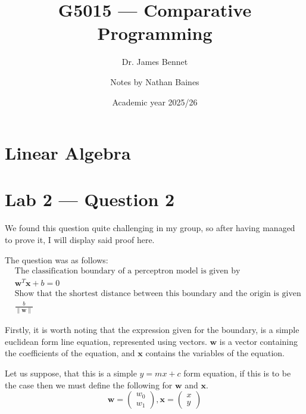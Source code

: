 \documentclass[a4paper]{article}
\title{G5015 --- Comparative Programming}
\author{Dr. James Bennet \and Notes by Nathan Baines}
\date{Academic year 2025/26}
\newcommand{\norm}[1]{\left\lVert#1\right\rVert}
\begin{document}
\maketitle

\tableofcontents

\section{Linear Algebra}




\appendix
\section{Lab 2 --- Question 2}
We found this question quite challenging in my group, so after having managed to prove it, I will display said proof here.

The question was as follows:
\begin{equation}\begin{split}
		&\textrm{The classification boundary of a perceptron model is given by}                    \\
		&\mathbf{w}^T\mathbf{x}+b=0                                                                \\
		&\textrm{Show that the shortest distance between this boundary and the origin is given by} \\
		&\frac{b}{\norm{\mathbf{w}}}
	\end{split}\end{equation}

Firstly, it is worth noting that the expression given for the boundary, is a simple euclidean form line equation, represented using vectors.
$\mathbf{w}$ is a vector containing the coefficients of the equation, and $\mathbf{x}$ contains the variables of the equation.

Let us suppose, that this is a simple $y=mx+c$ form equation, if this is to be the case then we must define the following for $\mathbf{w}$ and $\mathbf{x}$.
\begin{equation}
	\mathbf{w}=\left(\begin{matrix}w_0 \\ w_1\end{matrix}\right),
	\mathbf{x}=\left(\begin{matrix}x \\ y\end{matrix}\right)
\end{equation}
\end{document}
